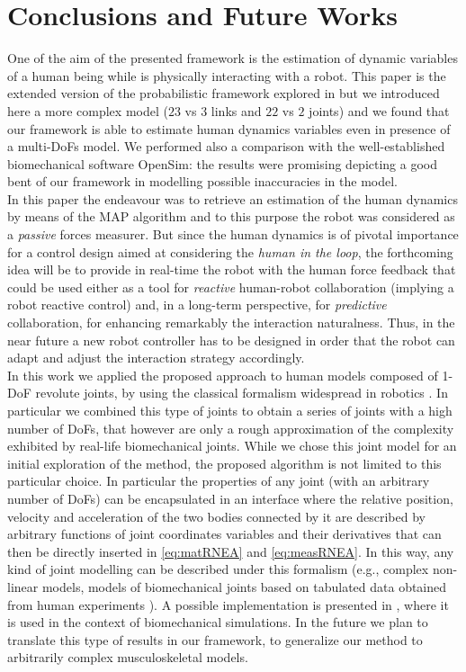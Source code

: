 
\section{Conclusions and Future Works}
%
One of the aim of the presented framework is the estimation of dynamic variables of 
a human being while is physically interacting with a robot.
 This paper is the extended version of the probabilistic framework explored in
  \cite{LatellaSensors2016} but we introduced here a more complex model ($23$ vs $3$
   links and $22$ vs $2$ joints) and we found that our framework is able to estimate
    human dynamics variables even in presence of a multi-DoFs model.  We performed
	 also a comparison with the well-established biomechanical software OpenSim:
	  the results were promising depicting a good bent of our framework in
 modelling possible inaccuracies in the model.
\\
\indent
In this paper the endeavour was to retrieve an estimation of the human dynamics by means of
 the MAP algorithm and to this purpose the robot was considered as a \emph{passive} forces
  measurer.  But since the human dynamics is of pivotal importance
   for a control design aimed at considering the \emph{human in the loop}, the forthcoming
    idea will be to provide in real-time the robot with the human force feedback
that could be used either as a tool for \emph{reactive} human-robot collaboration
(implying a robot reactive control) and, in a long-term perspective,
for \emph{predictive} collaboration, for enhancing remarkably the interaction naturalness.
Thus, in the near future a new robot controller has to be 
designed in order that the robot can adapt and adjust the interaction strategy accordingly.
 \\
 \indent
 In this work we applied the proposed approach to human models composed of 1-DoF revolute joints, 
 by using the classical formalism widespread in robotics \cite{Featherstone2008}.
 In particular we combined this type of joints to obtain a series of joints with a 
 high number of DoFs, that however are only a rough approximation of the complexity 
 exhibited by real-life biomechanical joints.
 While we chose this joint model for an initial exploration of the method, the proposed
  algorithm is not limited to this particular choice.
 In particular the properties of any joint (with an arbitrary number of DoFs) can be 
 encapsulated in an interface where the relative position, velocity and acceleration of 
 the two bodies connected by it are described by arbitrary functions of joint coordinates
  variables and their derivatives that can then be directly inserted in
   \eqref{eq:matRNEA} and \eqref{eq:measRNEA}. 
 In this way, any kind of joint modelling can be described under this formalism 
 (e.g., complex non-linear models, models of biomechanical joints based on tabulated data 
 obtained from human experiments \cite{delp1990interactive}). 
 A possible implementation is presented in
  \cite{seth2010minimal}, where it is used in the context of biomechanical simulations. 
 In the future we plan to translate this type of results in our framework, 
 to generalize our method to arbitrarily complex musculoskeletal models.
 
 
 
 
 
 
 
 
 
 
  
  